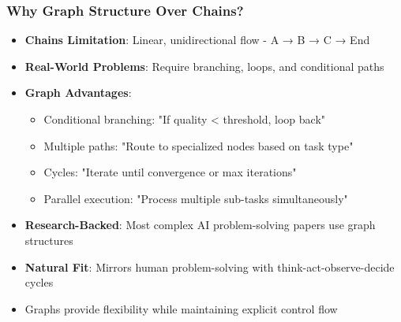 \begin{frame}[fragile]\frametitle{Why Graph Structure Over Chains?}
      \begin{itemize}
        \item \textbf{Chains Limitation}: Linear, unidirectional flow - A → B → C → End
        \item \textbf{Real-World Problems}: Require branching, loops, and conditional paths
        \item \textbf{Graph Advantages}:
        \begin{itemize}
            \item Conditional branching: "If quality < threshold, loop back"
            \item Multiple paths: "Route to specialized nodes based on task type"
            \item Cycles: "Iterate until convergence or max iterations"
            \item Parallel execution: "Process multiple sub-tasks simultaneously"
        \end{itemize}
        \item \textbf{Research-Backed}: Most complex AI problem-solving papers use graph structures
        \item \textbf{Natural Fit}: Mirrors human problem-solving with think-act-observe-decide cycles
        \item Graphs provide flexibility while maintaining explicit control flow
      \end{itemize}
\end{frame}

